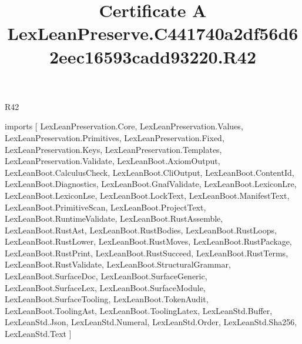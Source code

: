 \begin{lexlean}{R42}
\title{Certificate A LexLeanPreserve.C441740a2df56d62eec16593cadd93220.R42}
\begin{coremodule}
imports [
  LexLeanPreservation.Core,
  LexLeanPreservation.Values,
  LexLeanPreservation.Primitives,
  LexLeanPreservation.Fixed,
  LexLeanPreservation.Keys,
  LexLeanPreservation.Templates,
  LexLeanPreservation.Validate,
  LexLeanBoot.AxiomOutput,
  LexLeanBoot.CalculusCheck,
  LexLeanBoot.CliOutput,
  LexLeanBoot.ContentId,
  LexLeanBoot.Diagnostics,
  LexLeanBoot.GnafValidate,
  LexLeanBoot.LexiconLre,
  LexLeanBoot.LexiconLse,
  LexLeanBoot.LockText,
  LexLeanBoot.ManifestText,
  LexLeanBoot.PrimitiveScan,
  LexLeanBoot.ProjectText,
  LexLeanBoot.RuntimeValidate,
  LexLeanBoot.RustAssemble,
  LexLeanBoot.RustAst,
  LexLeanBoot.RustBodies,
  LexLeanBoot.RustLoops,
  LexLeanBoot.RustLower,
  LexLeanBoot.RustMoves,
  LexLeanBoot.RustPackage,
  LexLeanBoot.RustPrint,
  LexLeanBoot.RustSucceed,
  LexLeanBoot.RustTerms,
  LexLeanBoot.RustValidate,
  LexLeanBoot.StructuralGrammar,
  LexLeanBoot.SurfaceDoc,
  LexLeanBoot.SurfaceGeneric,
  LexLeanBoot.SurfaceLex,
  LexLeanBoot.SurfaceModule,
  LexLeanBoot.SurfaceTooling,
  LexLeanBoot.TokenAudit,
  LexLeanBoot.ToolingAst,
  LexLeanBoot.ToolingLatex,
  LexLeanStd.Buffer,
  LexLeanStd.Json,
  LexLeanStd.Numeral,
  LexLeanStd.Order,
  LexLeanStd.Sha256,
  LexLeanStd.Text
]


\end{coremodule}
\end{lexlean}
